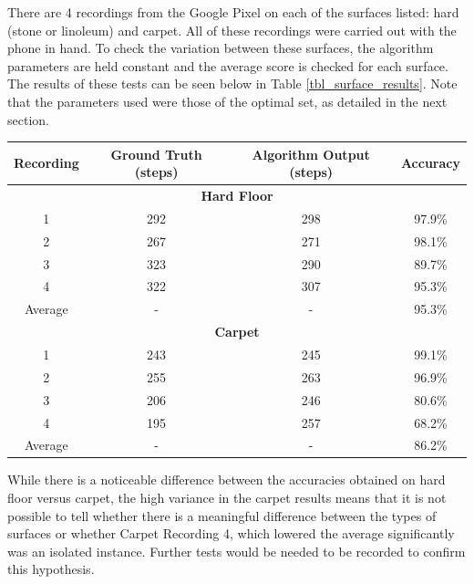                 There are 4 recordings from the Google Pixel on each of the surfaces listed: hard (stone or linoleum) and carpet. All of these recordings were carried out with the phone in hand. To check the variation between these surfaces, the algorithm parameters are held constant and the average score is checked for each surface. The results of these tests can be seen below in Table \ref{tbl_surface_results}. Note that the parameters used were those of the optimal set, as detailed in the next section.

                \begin{center}
                    \label{tbl_surface_results}
                    \begin{tabular}{|c|c|c|c|}
                        \hline
                        Recording & Ground Truth (steps) & Algorithm Output (steps) & Accuracy \\
                        \hline
                        \multicolumn{4}{|c|}{\textbf{Hard Floor}} \\
                        \hline
                        1 & 292 & 298 & 97.9\% \\
                        2 & 267 & 271 & 98.1\% \\
                        3 & 323 & 290 & 89.7\% \\
                        4 & 322 & 307 & 95.3\% \\
                        \hline
                        Average & - & - & 95.3\% \\
                        \hline
                        \multicolumn{4}{|c|}{\textbf{Carpet}} \\                        
                        \hline
                        1 & 243 & 245 & 99.1\% \\
                        2 & 255 & 263 & 96.9\% \\
                        3 & 206 & 246 & 80.6\% \\
                        4 & 195 & 257 & 68.2\% \\
                        \hline
                        Average & - & - & 86.2\% \\
                        \hline
                    \end{tabular}
                \end{center}

                While there is a noticeable difference between the accuracies obtained on hard floor versus carpet, the high variance in the carpet results means that it is not possible to tell whether there is a meaningful difference between the types of surfaces or whether Carpet Recording 4, which lowered the average significantly was an isolated instance. Further tests would be needed to be recorded to confirm this hypothesis.

